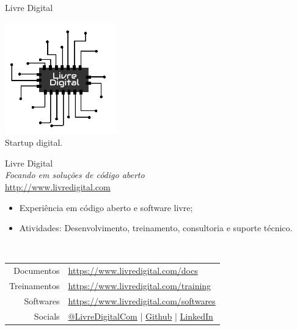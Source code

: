 \documentclass{beamer}
\begin{document}
\begin{frame}{Livre Digital}
  \begin{minipage}{0.25\textwidth}
    \includegraphics[width=\linewidth]{imgs/logo.png}\\
      \small{Startup digital.}
  \end{minipage}
  \begin{minipage}{0.7\textwidth}
    Livre Digital\\
    \small{\emph{Focando em soluções de código aberto}}\\
    \url{http://www.livredigital.com}
    \begin{itemize}
        \item Experiência em código aberto e software livre;
        \item Atividades: Desenvolvimento, treinamento, consultoria e suporte técnico.
    \end{itemize}
  \end{minipage}

  \\[0.65cm]

  \begin{tabular}{r l}
  Documentos & \url{https://www.livredigital.com/docs}\\
  Treinamentos & \url{https://www.livredigital.com/training}\\
  Softwares & \url{https://www.livredigital.com/softwares}\\[1cm]
  Socials & \href{https://www.twitter.com/LivreDigitalCom}{@LivreDigitalCom} | \href{https://www.github.com/livredigital}{Github} | \href{https://www.linkedin.com/company/livredigital}{LinkedIn}
  \end{tabular}
\end{frame}
\end{document}
